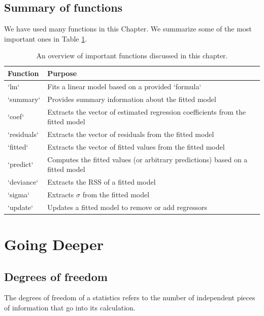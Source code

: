 \documentclass[
]{book}
\theoremstyle{definition}
\theoremstyle{definition}
\theoremstyle{definition}
\theoremstyle{definition}
\theoremstyle{remark}
\begin{document}
\hypertarget{summary-of-functions}{%
\subsection{Summary of functions}\label{summary-of-functions}}

We have used many functions in this Chapter. We summarize some of the most important ones in Table \ref{tab:function-df}.

\begin{table}

\caption{\label{tab:function-df}An overview of important functions discussed in this chapter.}
\centering
\begin{tabular}[t]{l>{\raggedright\arraybackslash}p{3in}}
\toprule
Function & Purpose\\
\midrule
`lm` & Fits a linear model based on a provided `formula`\\
`summary` & Provides summary information about the fitted model\\
`coef` & Extracts the vector of estimated regression coefficients from the fitted model\\
`residuals` & Extracts the vector of residuals from the fitted model\\
`fitted` & Extracts the vector of fitted values from the fitted model\\
\addlinespace
`predict` & Computes the fitted values (or arbitrary predictions) based on a fitted model\\
`deviance` & Extracts the RSS of a fitted model\\
`sigma` & Extracts $\hat{\sigma}$ from the fitted model\\
`update` & Updates a fitted model to remove or add regressors\\
\bottomrule
\end{tabular}
\end{table}

\hypertarget{going-deeper}{%
\section{Going Deeper}\label{going-deeper}}

\hypertarget{degrees-of-freedom}{%
\subsection{Degrees of freedom}\label{degrees-of-freedom}}

The degrees of freedom of a statistics refers to the number of independent pieces of information that go into its calculation.
\end{document}
